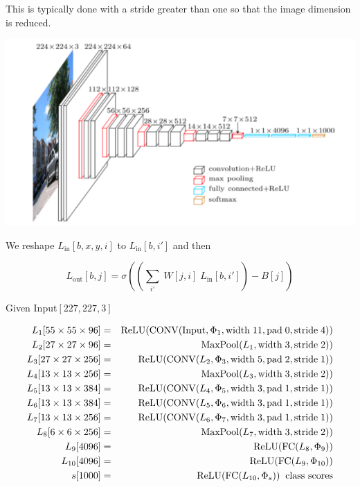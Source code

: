 {\vfill
This is typically done with a stride greater than one so that the image dimension is reduced.



\centerline{\includegraphics[width = 8.0in]{../images/VGG}}



We reshape $L_{\mathrm{in}}[b,x,y,i]$ to $L_{\mathrm{in}}[b,i']$ and then

\vfill
$$L_{\mathrm{out}}[b,j] = \sigma\left(\left(\sum_{i'} \;W[j,i]\;L_{\mathrm{in}}[b,i']\right) - B[j]\right)$$

{\huge
\centerline{Given Input$[227,227,3]$}

\begin{eqnarray*}
L_1[55 \times 55 \times 96] & = & \mathrm{ReLU}(\mathrm{CONV}(\mathrm{Input},\Phi_1,\mathrm{width}\;11,\mathrm{pad}\;0,\mathrm{stride}\;4)) \\
L_2[27 \times 27 \times 96] & = & \mathrm{MaxPool}(L_1,\mathrm{width}\;3,\mathrm{stride}\;2))  \\
L_3[27 \times 27 \times 256] & = & \mathrm{ReLU}(\mathrm{CONV}(L_2,\Phi_3,\mathrm{width}\;5,\mathrm{pad}\;2,\mathrm{stride}\;1))  \\
L_4[13 \times 13 \times 256] & = & \mathrm{MaxPool}(L_3,\mathrm{width}\;3,\mathrm{stride}\;2))  \\
L_5[13 \times 13 \times 384] & = & \mathrm{ReLU}(\mathrm{CONV}(L_4,\Phi_5,\mathrm{width}\;3,\mathrm{pad}\;1,\mathrm{stride}\;1))  \\
L_6[13 \times 13 \times 384] & = & \mathrm{ReLU}(\mathrm{CONV}(L_5,\Phi_6,\mathrm{width}\;3,\mathrm{pad}\;1,\mathrm{stride}\;1))  \\
L_7[13 \times 13 \times 256] & = & \mathrm{ReLU}(\mathrm{CONV}(L_6,\Phi_7,\mathrm{width}\;3,\mathrm{pad}\;1,\mathrm{stride}\;1))  \\
L_8[6 \times 6 \times 256] & = & \mathrm{MaxPool}(L_7,\mathrm{width}\;3,\mathrm{stride}\;2)) \\
L_9[4096] & = & \mathrm{ReLU}(\mathrm{FC}(L_8,\Phi_9)) \\
L_{10}[4096] & = & \mathrm{ReLU}(\mathrm{FC}(L_9,\Phi_{10})) \\
s[1000] & = & \mathrm{ReLU}(\mathrm{FC}(L_{10},\Phi_s)) \;\;\mbox{class scores}
\end{eqnarray*}
}

}
